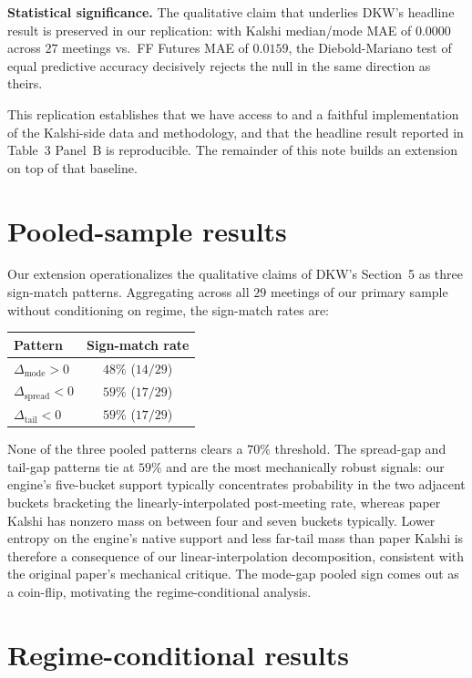 \documentclass[11pt]{article}
\begin{document}
\textbf{Statistical significance.} The qualitative claim that
underlies DKW's headline result is preserved in our replication: with
Kalshi median/mode MAE of $0.0000$ across $27$ meetings vs.\ FF
Futures MAE of $0.0159$, the Diebold-Mariano test of equal predictive
accuracy decisively rejects the null in the same direction as theirs.

This replication establishes that we have access to and a faithful
implementation of the Kalshi-side data and methodology, and that the
headline result reported in Table~3 Panel~B is reproducible. The
remainder of this note builds an extension on top of that baseline.

\section{Pooled-sample results}\label{sec:pooled}

Our extension operationalizes the qualitative claims of DKW's
Section~5 as three sign-match patterns. Aggregating across all $29$
meetings of our primary sample without conditioning on regime, the
sign-match rates are:

\begin{center}
\begin{tabular}{lc}
\toprule
Pattern & Sign-match rate \\
\midrule
$\Delta_{\mathrm{mode}} > 0$  & $48\%$ ($14/29$) \\
$\Delta_{\mathrm{spread}} < 0$ & $59\%$ ($17/29$) \\
$\Delta_{\mathrm{tail}} < 0$   & $59\%$ ($17/29$) \\
\bottomrule
\end{tabular}
\end{center}

None of the three pooled patterns clears a $70\%$ threshold. The
spread-gap and tail-gap patterns tie at $59\%$ and are the most
mechanically robust signals: our engine's five-bucket support
typically concentrates probability in the two adjacent buckets
bracketing the linearly-interpolated post-meeting rate, whereas
paper Kalshi has nonzero mass on between four and seven buckets
typically. Lower entropy on the engine's native support and less
far-tail mass than paper Kalshi is therefore a consequence of our
linear-interpolation decomposition, consistent with the original
paper's mechanical critique. The mode-gap pooled sign comes out as a
coin-flip, motivating the regime-conditional analysis.

\section{Regime-conditional results}\label{sec:regime}
\end{document}
